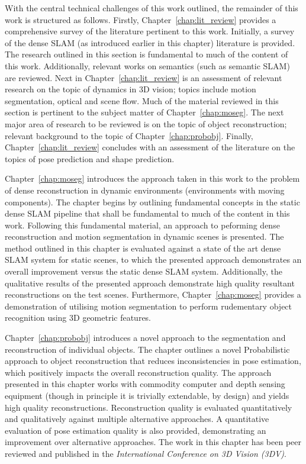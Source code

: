 With the central technical challenges of this work outlined, the remainder of this work is structured 
as follows. Firstly, Chapter~\ref{chap:lit_review} provides a comprehensive survey of the literature 
pertinent to this work. Initially, a survey of the dense SLAM (as introduced earlier in this chapter) 
literature is provided. The research outlined in this section is fundamental to much of the content of 
this work. Additionally, relevant works on semantics (such as semantic SLAM) are reviewed. 
Next in Chapter~\ref{chap:lit_review} is an assessment of relevant research on the topic of dynamics in 
3D vision; topics include motion segmentation, optical and scene flow. Much of the material reviewed in 
this section is pertinent to the subject matter of Chapter~\ref{chap:moseg}. The next major area of 
research to be reviewed is on the topic of object reconstruction; relevant background to the topic of 
Chapter~\ref{chap:probobj}. Finally, Chapter~\ref{chap:lit_review} concludes with an assessment of the 
literature on the topics of pose prediction and shape prediction.

Chapter~\ref{chap:moseg} introduces the approach taken in this work to the problem of dense reconstruction 
in dynamic environments (environments with moving components). The chapter begins by outlining fundamental 
concepts in the static dense SLAM pipeline that shall be fundamental to much of the content in this work. 
Following this fundamental material, an approach to peforming dense reconstruction and motion segmentation 
in dynamic scenes is presented. The method outlined in this chapter is evaluated against a state of the art 
dense SLAM system for static scenes, to which the presented approach demonstrates an overall improvement 
versus the static dense SLAM system. Additionally, the qualitative results of the presented approach 
demonstrate high quality resultant reconstructions on the test scenes. Furthermore, Chapter~\ref{chap:moseg} 
provides a demonstration of utilising motion segmentation to perform rudementary object recognition using 
3D geometric features.

Chapter~\ref{chap:probobj} introduces a novel approach to the segmentation and reconstruction of individual 
objects. The chapter outlines a novel Probabilistic approach to object reconstruction that reduces 
inconsistencies in pose estimation, which positively impacts the overall reconstruction quality. The 
approach presented in this chapter works with commodity computer and depth sensing equipment (though in 
principle it is trivially extendable, by design) and yields high quality reconstructions. Reconstruction 
quality is evaluated quantitatively and qualitatively against multiple alternative approaches. A 
quantitative evaluation of pose estimation quality is also provided, demonstrating an improvement over 
alternative approaches. The work in this chapter has been peer reviewed and published in the 
\textit{International Conference on 3D Vision (3DV)}.

